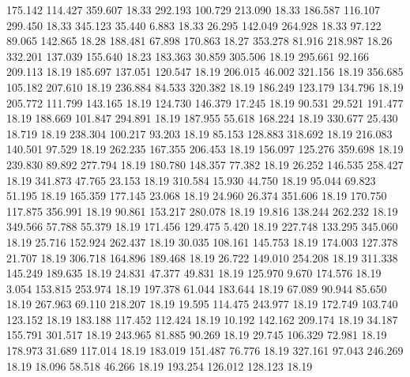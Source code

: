  175.142  114.427  359.607        18.33
 292.193  100.729  213.090        18.33
 186.587  116.107  299.450        18.33
 345.123   35.440    6.883        18.33
  26.295  142.049  264.928        18.33
  97.122   89.065  142.865        18.28
 188.481   67.898  170.863        18.27
 353.278   81.916  218.987        18.26
 332.201  137.039  155.640        18.23
 183.363   30.859  305.506        18.19
 295.661   92.166  209.113        18.19
 185.697  137.051  120.547        18.19
 206.015   46.002  321.156        18.19
 356.685  105.182  207.610        18.19
 236.884   84.533  320.382        18.19
 186.249  123.179  134.796        18.19
 205.772  111.799  143.165        18.19
 124.730  146.379   17.245        18.19
  90.531   29.521  191.477        18.19
 188.669  101.847  294.891        18.19
 187.955   55.618  168.224        18.19
 330.677   25.430   18.719        18.19
 238.304  100.217   93.203        18.19
  85.153  128.883  318.692        18.19
 216.083  140.501   97.529        18.19
 262.235  167.355  206.453        18.19
 156.097  125.276  359.698        18.19
 239.830   89.892  277.794        18.19
 180.780  148.357   77.382        18.19
  26.252  146.535  258.427        18.19
 341.873   47.765   23.153        18.19
 310.584   15.930   44.750        18.19
  95.044   69.823   51.195        18.19
 165.359  177.145   23.068        18.19
  24.960   26.374  351.606        18.19
 170.750  117.875  356.991        18.19
  90.861  153.217  280.078        18.19
  19.816  138.244  262.232        18.19
 349.566   57.788   55.379        18.19
 171.456  129.475    5.420        18.19
 227.748  133.295  345.060        18.19
  25.716  152.924  262.437        18.19
  30.035  108.161  145.753        18.19
 174.003  127.378   21.707        18.19
 306.718  164.896  189.468        18.19
  26.722  149.010  254.208        18.19
 311.338  145.249  189.635        18.19
  24.831   47.377   49.831        18.19
 125.970    9.670  174.576        18.19
   3.054  153.815  253.974        18.19
 197.378   61.044  183.644        18.19
  67.089   90.944   85.650        18.19
 267.963   69.110  218.207        18.19
  19.595  114.475  243.977        18.19
 172.749  103.740  123.152        18.19
 183.188  117.452  112.424        18.19
  10.192  142.162  209.174        18.19
  34.187  155.791  301.517        18.19
 243.965   81.885   90.269        18.19
  29.745  106.329   72.981        18.19
 178.973   31.689  117.014        18.19
 183.019  151.487   76.776        18.19
 327.161   97.043  246.269        18.19
  18.096   58.518   46.266        18.19
 193.254  126.012  128.123        18.19
